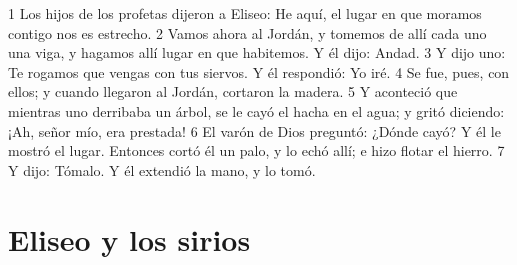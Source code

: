 1 Los hijos de los profetas dijeron a Eliseo: He aquí, el lugar en que moramos contigo nos es estrecho.
2 Vamos ahora al Jordán, y tomemos de allí cada uno una viga, y hagamos allí lugar en que habitemos. Y él dijo: Andad.
3 Y dijo uno: Te rogamos que vengas con tus siervos. Y él respondió: Yo iré.
4 Se fue, pues, con ellos; y cuando llegaron al Jordán, cortaron la madera.
5 Y aconteció que mientras uno derribaba un árbol, se le cayó el hacha en el agua; y gritó diciendo: ¡Ah, señor mío, era prestada!
6 El varón de Dios preguntó: ¿Dónde cayó? Y él le mostró el lugar. Entonces cortó él un palo, y lo echó allí; e hizo flotar el hierro.
7 Y dijo: Tómalo. Y él extendió la mano, y lo tomó.

\section*{Eliseo y los sirios}

